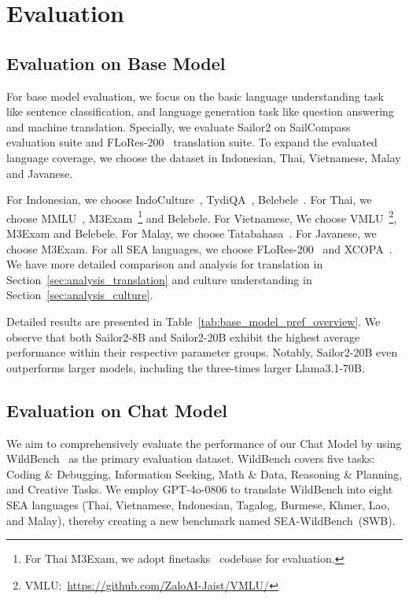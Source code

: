 \section{Evaluation}

\subsection{Evaluation on Base Model}

For base model evaluation, we focus on the basic language understanding task like sentence classification, and language generation task like question answering and machine translation.
Specially, we evaluate Sailor2 on SailCompass~\citep{sailcompass} evaluation suite and FLoRes-200~\citep{nllb2022} translation suite.
To expand the evaluated language coverage, we choose the dataset in Indonesian, Thai, Vietnamese, Malay and Javanese. 

For Indonesian, we choose IndoCulture~\citep{koto2024indoculture}, TydiQA~\citep{tydiqa}, Belebele~\citep{bandarkar-etal-2024-belebele}.
For Thai, we choose MMLU~\citep{kydlicek2024finetasksmultilingualtasks}, M3Exam~\citep{zhang2023m3exam}\footnote{For Thai M3Exam, we adopt finetasks~\citep{kydlicek2024finetasksmultilingualtasks} codebase for evaluation.} and Belebele.
For Vietnamese, We choose VMLU~\footnote{VMLU:~\url{https://github.com/ZaloAI-Jaist/VMLU/}}, M3Exam and Belebele.
For Malay, we choose Tatabahasa~\citep{lovenia2024seacrowd}.
For Javanese, we choose M3Exam.
For all SEA languages, we choose FLoRes-200~\citep{nllb2022} and XCOPA~\citep{ponti2020xcopa}. 
We have more detailed comparison and analysis for translation in Section~\ref{sec:analysis_translation} and culture understanding in Section~\ref{sec:analysis_culture}. 

Detailed results are presented in Table~\ref{tab:base_model_pref_overview}. We observe that both Sailor2-8B and Sailor2-20B exhibit the highest average performance within their respective parameter groups. Notably, Sailor2-20B even outperforms larger models, including the three-times larger Llama3.1-70B.





\subsection{Evaluation on Chat Model}

We aim to comprehensively evaluate the performance of our Chat Model by using WildBench~\citep{lin2024wildbenchbenchmarkingllmschallenging} as the primary evaluation dataset. WildBench covers five tasks: Coding \& Debugging, Information Seeking, Math \& Data, Reasoning \& Planning, and Creative Tasks. We employ GPT-4o-0806 to translate WildBench into eight SEA languages (Thai, Vietnamese, Indonesian, Tagalog, Burmese, Khmer, Lao, and Malay), thereby creating a new benchmark named SEA-WildBench~(SWB).

